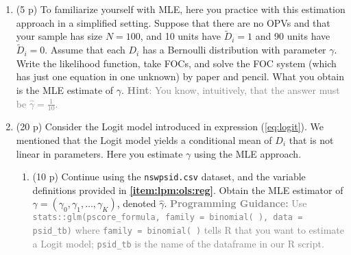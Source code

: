 \documentclass[
]{article}
\newenvironment{Shaded}{\begin{snugshade}}{\end{snugshade}}
\newcommand{\AttributeTok}[1]{\textcolor[rgb]{0.13,0.29,0.53}{#1}}
\newcommand{\FunctionTok}[1]{\textcolor[rgb]{0.13,0.29,0.53}{\textbf{#1}}}
\newcommand{\NormalTok}[1]{#1}
\newcommand{\OtherTok}[1]{\textcolor[rgb]{0.56,0.35,0.01}{#1}}
\newcommand{\SpecialCharTok}[1]{\textcolor[rgb]{0.81,0.36,0.00}{\textbf{#1}}}
\newcommand{\StringTok}[1]{\textcolor[rgb]{0.31,0.60,0.02}{#1}}
\begin{document}
\begin{enumerate}
\def\labelenumi{\arabic{enumi}.}
\setcounter{enumi}{3}
\item
  (5 p) To familiarize yourself with MLE, here you practice with this
  estimation approach in a simplified setting. Suppose that there are no
  OPVs and that your sample has size \(N=100\), and 10 units have
  \(\tilde{D}_i=1\) and 90 units have \(\tilde{D}_i=0\). Assume that
  each \(D_i\) has a Bernoulli distribution with parameter \(\gamma\).
  Write the likelihood function, take FOCs, and solve the FOC system
  (which has just one equation in one unknown) by paper and pencil. What
  you obtain is the MLE estimate of \(\gamma\).
  \textcolor{gray}{\textbf{Hint}: You know, intuitively, that the answer must be $\hat{\gamma}=\frac{1}{10}$.}
\item
  (20 p) Consider the Logit model introduced in expression
  (\ref{eq:logit}). We mentioned that the Logit model yields a
  conditional mean of \(D_i\) that is not linear in parameters. Here you
  estimate \(\gamma\) using the MLE approach.

  \begin{enumerate}
  \def\labelenumii{\alph{enumii}.}
  \item
    (10 p) Continue using the \texttt{nswpsid.csv} dataset, and the
    variable definitions provided in \textbf{\ref{item:lpm:ols:reg}}.
    Obtain the MLE estimator of
    \(\gamma= (\gamma_0,\gamma_1,\dots,\gamma_K)\), denoted
    \(\hat{\gamma}\).
    \textcolor{gray}{\textbf{Programming Guidance:} Use \\ \texttt{stats::glm(pscore\_formula, family = binomial( ), data = psid\_tb)} where \texttt{family = binomial( )} tells R that you want to estimate a Logit model; \texttt{psid\_tb} is the name of the dataframe in our R script.}\label{item:logit:reg}
    \newpage

\begin{Shaded}
\end{Shaded}


\end{enumerate}
\end{enumerate}
\end{document}
